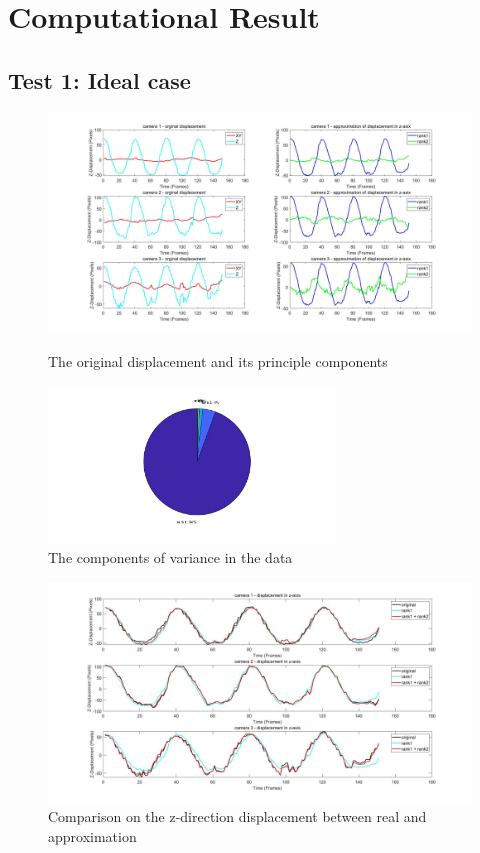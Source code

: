 \documentclass{article}
\begin{document}
\section{Computational Result}
\subsection{Test 1: Ideal case}
\begin{figure}[h]
    \centerline{\includegraphics[width=8in]{case11.jpg}}
    \caption{The original displacement and its principle components}
    \centerline{\includegraphics[width=3in]{case12.jpg}}
    \caption{The components of variance in the data}
\end{figure}
\begin{figure}[h]
    \centerline{\includegraphics[width=8in]{case13.jpg}}
    \caption{Comparison on the z-direction displacement between real and approximation}
\end{figure}
\end{document}
